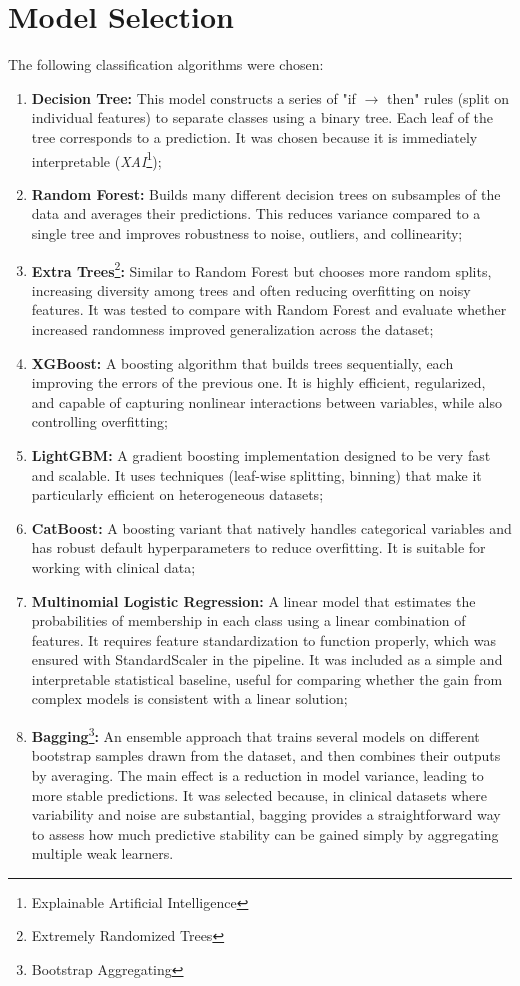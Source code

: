 \section{Model Selection}
The following classification algorithms were chosen:
\begin{enumerate}
	\item \textbf{Decision Tree:} This model constructs a series of "if $\to$ then" rules (split on individual features) to separate classes using a binary tree. Each leaf of the tree corresponds to a prediction. It was chosen because it is immediately interpretable (\textit{XAI}\footnote{Explainable Artificial Intelligence});
	\item \textbf{Random Forest:} Builds many different decision trees on subsamples of the data and averages their predictions. This reduces variance compared to a single tree and improves robustness to noise, outliers, and collinearity;
	\item \textbf{Extra Trees}\footnote{Extremely Randomized Trees}\textbf{:} Similar to Random Forest but chooses more random splits, increasing diversity among trees and often reducing overfitting on noisy features. It was tested to compare with Random Forest and evaluate whether increased randomness improved generalization across the dataset;
	\item \textbf{XGBoost:} A boosting algorithm that builds trees sequentially, each improving the errors of the previous one. It is highly efficient, regularized, and capable of capturing nonlinear interactions between variables, while also controlling overfitting;
	\item \textbf{LightGBM:} A gradient boosting implementation designed to be very fast and scalable. It uses techniques (leaf-wise splitting, binning) that make it particularly efficient on heterogeneous datasets;
	\item \textbf{CatBoost:} A boosting variant that natively handles categorical variables and has robust default hyperparameters to reduce overfitting. It is suitable for working with clinical data;
	\item \textbf{Multinomial Logistic Regression:} A linear model that estimates the probabilities of membership in each class using a linear combination of features. It requires feature standardization to function properly, which was ensured with StandardScaler in the pipeline. It was included as a simple and interpretable statistical baseline, useful for comparing whether the gain from complex models is consistent with a linear solution;
	\item \textbf{Bagging}\footnote{Bootstrap Aggregating}\textbf{:} An ensemble approach that trains several models on different bootstrap samples drawn from the dataset, and then combines their outputs by averaging. The main effect is a reduction in model variance, leading to more stable predictions. It was selected because, in clinical datasets where variability and noise are substantial, bagging provides a straightforward way to assess how much predictive stability can be gained simply by aggregating multiple weak learners.
\end{enumerate}

